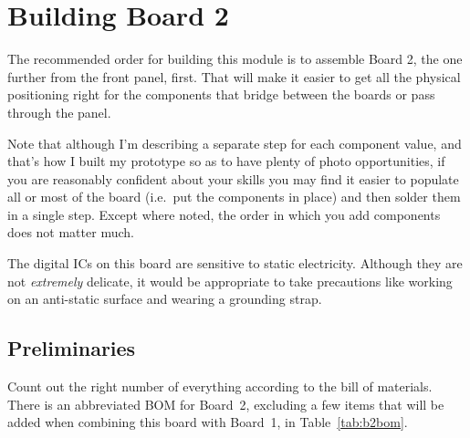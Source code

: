 
%
%
%
%
%
%

\chapter{Building Board 2}

The recommended order for building this module is to assemble Board 2, the
one further from the front panel, first.  That will make it easier to get
all the physical positioning right for the components that bridge between
the boards or pass through the panel.

Note that although I'm describing a separate step for each component value,
and that's how I built my prototype so as to have plenty of photo
opportunities, if you are reasonably confident about your skills you may
find it easier to populate all or most of the board (i.e.\ put the
components in place) and then solder them in a single step.  Except where
noted, the order in which you add components does not matter much.

The digital ICs on this board are sensitive to static electricity.  Although
they are not \emph{extremely} delicate, it would be appropriate to take
precautions like working on an anti-static surface and wearing a grounding
strap.

\section{Preliminaries}

Count out the right number of everything according to the bill of materials. 
There is an abbreviated BOM for Board~2, excluding a few items that will be
added when combining this board with Board~1, in Table~\ref{tab:b2bom}.

